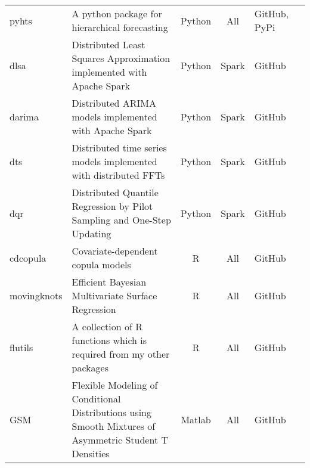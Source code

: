 \documentclass[twoside,a4paper]{article}
\begin{document}
\begin{refsection}
\begin{center}
\begin{tabular}{lp{6cm}cclp{3cm}}
pyhts         & A python package for hierarchical forecasting                                                                                           & Python   & All         & GitHub, PyPi & \citet{ZhangB2023OptimalReconciliation}                     \\
dlsa          & Distributed Least Squares Approximation implemented with Apache Spark                                                                   & Python   & Spark       & GitHub       & \citet{ZhuX2021LeastSquareApproximation}                    \\
darima        & Distributed ARIMA models implemented with Apache Spark                                                                                  & Python   & Spark       & GitHub       & \citet{WangX2023DistributedARIMA}                           \\
dts           & Distributed time series models implemented with distributed FFTs                                                                        & Python   & Spark       & GitHub                                                                     \\
dqr           & Distributed Quantile Regression by Pilot Sampling and One-Step Updating                                                                 & Python   & Spark       & GitHub       & \citet{PanR2022NoteDistributed}                             \\
cdcopula      & Covariate-dependent copula models                                                                                                       & R        & All         & GitHub       & \citet{LiF2018ImprovingForecasting}                         \\
movingknots   & Efficient Bayesian Multivariate Surface Regression                                                                                      & R        & All         & GitHub       & \citet{LiF2013EfficientBayesian}                            \\
flutils       & A collection of R functions which is required from my other packages                                                                    & R        & All         & GitHub                                                                     \\
GSM           & Flexible Modeling of Conditional Distributions using Smooth Mixtures of Asymmetric Student T Densities                                  & Matlab   & All         & GitHub       & \citet{LiF2010FlexibleModeling}                             \\
  \bottomrule
\end{tabular}
\end{center}

\end{refsection}
\end{document}
